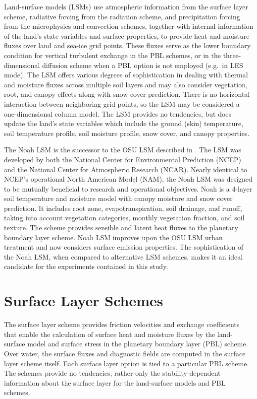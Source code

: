 Land-surface models (LSMs) use atmospheric information from the surface layer scheme, radiative forcing from the radiation scheme, and precipitation forcing from the microphysics and convection schemes, together with internal information of the land's state variables and surface properties, to provide heat and moisture fluxes over land and sea-ice grid points. These fluxes serve as the lower boundary condition for vertical turbulent exchange in the PBL schemes, or in the three-dimensional diffusion scheme when a PBL option is not employed (e.g.\ in LES mode). The LSM offers various degrees of sophistication in dealing with thermal and moisture fluxes across multiple soil layers and may also consider vegetation, root, and canopy effects along with snow cover prediction. There is no horizontal interaction between neighboring grid points, so the LSM may be considered a one-dimensional column model. The LSM provides no tendencies, but does update the land's state variables which include the ground (skin) temperature, soil temperature profile, soil moisture profile, snow cover, and canopy properties.

The Noah LSM is the successor to the OSU LSM described in  \citet{ChenDud}. The LSM was developed by both the National Center for Environmental Prediction (NCEP) and the National Center for Atmospheric Research (NCAR). Nearly identical to NCEP's operational North American Model (NAM), the Noah LSM was designed to be mutually beneficial to research and operational objectives. Noah is a 4-layer soil temperature and moisture model with canopy moisture and snow cover prediction. It includes root zone, evapotranspiration, soil drainage, and runoff, taking into account vegetation categories, monthly vegetation fraction, and soil texture. The scheme provides sensible and latent heat fluxes to the planetary boundary layer scheme. Noah LSM improves upon the OSU LSM urban treatment and now considers surface emission properties. The sophistication of the Noah LSM, when compared to alternative LSM schemes, makes it an ideal candidate for the experiments contained in this study.

\section{Surface Layer Schemes}
\label{surface-layer-35}

The surface layer scheme provides friction velocities and exchange coefficients that enable the calculation of surface heat and moisture fluxes by the land-surface model and surface stress in the planetary boundary layer (PBL) scheme. Over water, the surface fluxes and diagnostic fields are computed in the surface layer scheme itself. Each surface layer option is tied to a particular PBL scheme. The schemes provide no tendencies, rather only the stability-dependent information about the surface layer for the land-surface models and PBL schemes.

